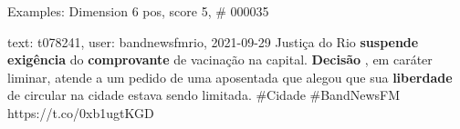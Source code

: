 \begin{frame}{Examples: Dimension 6 pos, score 5, \# 000035}
\footnotesize
\begin{exampleblock}{text: t078241, user: bandnewsfmrio, 2021-09-29}
Justiça do Rio \textbf{suspende} \textbf{exigência} do \textbf{comprovante} de 
vacinação na capital. \textbf{Decisão} , em caráter liminar, atende a um pedido 
de uma aposentada que alegou que sua \textbf{liberdade} de circular na cidade 
estava sendo limitada. \#Cidade \#BandNewsFM https://t.co/0xb1ugtKGD 
\end{exampleblock}
\end{frame}
